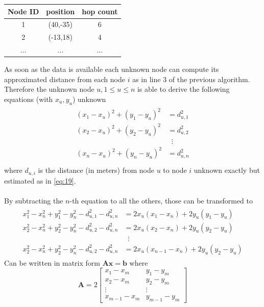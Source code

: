 \documentclass[12pt]{report}
\begin{document}
\begin{center}
\begin{tabular}{ |c|c|c| } 
 \hline
 Node ID & position & hop count \\ 
 \hline
 \hline
 1 & (40,-35) & 6 \\ 
 2 & (-13,18) & 4 \\
 $\hdots$ & $\hdots$ & $\hdots$\\
 \hline
\end{tabular}
\end{center}
As soon as the data is available each unknown node can compute its approximated distance from each node $i $ as in line $3$ of the previous algorithm. Therefore the unknown node $u, 1\leq u\leq n$ is able to derive the following equations (with $x_u,y_u$) unknown
\begin{align}
\begin{split} 
(x_1-x_u)^2+(y_1-y_u)^2&=d_{u,1}^2 \\ 
(x_2-x_u)^2+(y_2-y_u)^2&=d_{u,2}^2 \\ 
&\;\;\vdots\\
(x_n-x_u)^2+(y_n-y_u)^2&=d_{u,n}^2 \\
\end{split}
\end{align} 
where $d_{u,i}$ is the distance (in meters) from node $u$ to node $i$ unknown exactly but estimated as in \ref{eq:19}.
\\\\By subtracting the $n$-th equation to all the others, those can be transformed to
\begin{align}
\begin{split} 
x_1^2-x_n^2+y_1^2-y_n^2-d_{u,1}^2-d_{u,n}^2&=2x_u(x_1-x_n)+2y_u(y_1-y_u)\\ 
x_2^2-x_n^2+y_2^2-y_n^2-d_{u,2}^2-d_{u,n}^2&=2x_u(x_2-x_n)+2y_u(y_2-y_u)\\
&\;\;\vdots\\
x_2^2-x_n^2+y_2^2-y_n^2-d_{u,2}^2-d_{u,n}^2&=2x_u(x_{n-1}-x_n)+2y_u(y_2-y_u)
\end{split}
\end{align}
Can be written in matrix form $\mathbf{Ax}=\mathbf{b}$
where 
\begin{equation}
    \mathbf{A}=2\begin{bmatrix}
    x_1-x_m & y_1-y_m\\
    x_2-x_m & y_2-y_m\\
    \vdots & \vdots\\
    x_{m-1}-x_m & y_{m-1}-y_m
    \end{bmatrix}
\end{equation}
\end{document}
